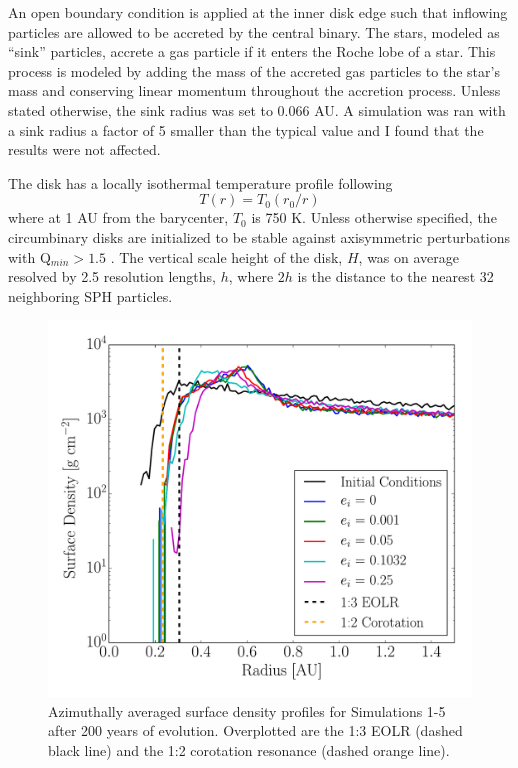 An open boundary condition is applied at the inner disk edge such that inflowing particles are allowed to be accreted
by the central binary.  The stars, modeled as ``sink'' particles, accrete a gas particle if it enters the Roche lobe of a star.  This process is modeled by adding the mass of the accreted gas particles to the star's mass and conserving linear momentum throughout the accretion process.  Unless stated otherwise, the 
sink radius was set to 0.066 AU.  A simulation was ran with a sink radius a factor of 5 smaller than the typical value and I found that the results were not 
affected.
 
The disk has a locally isothermal temperature profile following 
\begin{equation}
\label{CBDisk:eqn:disc_temp_profile}
T(r) = T_0(r_0/r)
\end{equation}
where at 1 AU from the barycenter, $T_0$ is
750 K.  Unless otherwise specified, the circumbinary disks are initialized to be stable against axisymmetric perturbations with Q$_{min} > 1.5$ \citep{Toomre1964}.
The vertical scale height of the disk, $H$, was on average resolved by
  2.5 resolution lengths, $h$, where $2 h$ is the distance
to the nearest 32 neighboring SPH particles.

\begin{figure}
	\includegraphics[width=\columnwidth]{f1}
    \caption{Azimuthally averaged surface density profiles for Simulations 1-5 after 200 years of evolution.  Overplotted are the 1:3 EOLR (dashed black line) and the 1:2 corotation resonance (dashed orange line).}
    \label{fig:CBDiskSurfaceDensity}
\end{figure}

